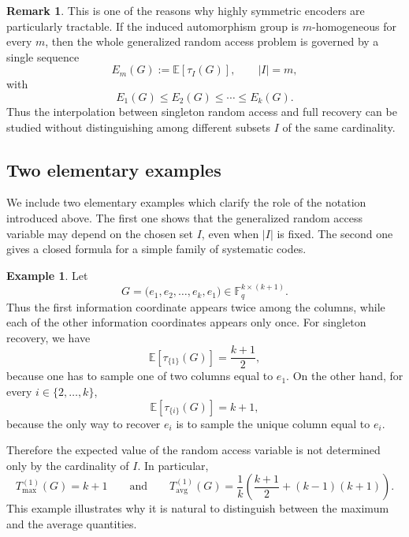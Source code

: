 \documentclass[11pt,a4paper]{article}
\numberwithin{equation}{section}
\theoremstyle{definition}
\newtheorem{example}[definition]{Example}
\newtheorem{remark}[definition]{Remark}
\theoremstyle{definition}
\newcommand{\F}{\mathbb{F}}
\newcommand{\E}{\mathbb{E}}
\begin{document}
\begin{remark}
This is one of the reasons why highly symmetric encoders are particularly
tractable. If the induced automorphism group is $m$-homogeneous for every
$m$, then the whole generalized random access problem is governed by a
single sequence
\[
E_m(G):=\E[\tau_I(G)],\qquad |I|=m,
\]
with
\[
E_1(G)\leq E_2(G)\leq \cdots \leq E_k(G).
\]
Thus the interpolation between singleton random access and full recovery can
be studied without distinguishing among different subsets $I$ of the same
cardinality.
\end{remark}



\subsection{Two elementary examples}\label{subsec:elementary-examples}

We include two elementary examples which clarify the role of the notation
introduced above.  The first one shows that the generalized random access
variable may depend on the chosen set $I$, even when $|I|$ is fixed.  The
second one gives a closed formula for a simple family of systematic codes.

\begin{example}\label{ex:asymmetric}
Let
\[
G=\bigl(e_1,e_2,\ldots,e_k,e_1\bigr)\in \F_q^{k\times (k+1)}.
\]
Thus the first information coordinate appears twice among the columns, while
each of the other information coordinates appears only once.  For singleton
recovery, we have
\[
\E[\tau_{\{1\}}(G)]=\frac{k+1}{2},
\]
because one has to sample one of two columns equal to $e_1$.  On the other
hand, for every $i\in\{2,\ldots,k\}$,
\[
\E[\tau_{\{i\}}(G)]=k+1,
\]
because the only way to recover $e_i$ is to sample the unique column equal
to $e_i$.

Therefore the expected value of the random access variable is not determined
only by the cardinality of $I$.  In particular,
\[
T_{\max}^{(1)}(G)=k+1
\qquad\text{and}\qquad
T_{\mathrm{avg}}^{(1)}(G)
=
\frac{1}{k}
\left(
\frac{k+1}{2}+(k-1)(k+1)
\right).
\]
This example illustrates why it is natural to distinguish between the maximum
and the average quantities.
\end{example}
\end{document}
